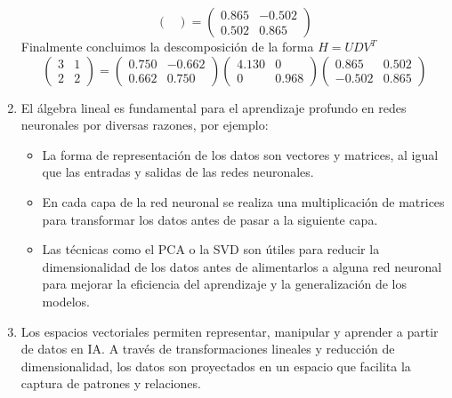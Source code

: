 \documentclass[12pt, letterpaper]{article}
\begin{document}
\begin{enumerate}
\begin{equation*}
\begin{pmatrix}
        \end{pmatrix}
        = \begin{pmatrix}
            0.865 & -0.502 \\
            0.502 & 0.865
        \end{pmatrix}
    \end{equation*}
    Finalmente concluimos la descomposición de la forma $H=UDV^{T}$
    \begin{equation*}
        \begin{pmatrix}
            3 & 1 \\
            2 & 2
        \end{pmatrix}
        =
        \begin{pmatrix}
            0.750 & -0.662 \\
            0.662 & 0.750
        \end{pmatrix}
        \begin{pmatrix}
            4.130 & 0 \\
            0 & 0.968
        \end{pmatrix}
        \begin{pmatrix}
            0.865 & 0.502 \\
            -0.502 & 0.865
        \end{pmatrix}
    \end{equation*}
    \item El álgebra lineal es fundamental para el aprendizaje profundo en redes neuronales por diversas razones, por ejemplo: 
    \begin{itemize}
        \item La forma de representación de los datos son vectores y matrices, al igual que las entradas y salidas de las redes neuronales.
        \item En cada capa de la red neuronal se realiza una multiplicación de matrices para transformar los datos antes de pasar a la siguiente capa.
        \item Las técnicas como el PCA o la SVD son útiles para reducir la dimensionalidad de los datos antes de alimentarlos a alguna red neuronal para mejorar la eficiencia del aprendizaje y la generalización de los modelos.
    \end{itemize}
    \item Los espacios vectoriales permiten representar, manipular y aprender a partir de datos en IA. A través de transformaciones lineales y reducción de dimensionalidad, los datos son proyectados en un espacio que facilita la captura de patrones y relaciones.
\end{enumerate}
\end{document}
